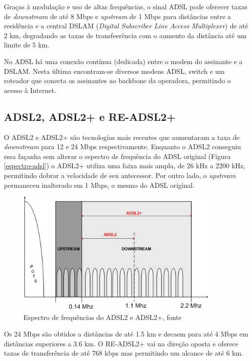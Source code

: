 \documentclass[brazil,times,12pt]{abnt}
\begin{document}
Graças à modulação e uso de altas frequências, o sinal ADSL pode oferecer taxas
de \emph{downstream} de até 8 Mbps e \emph{upstream} de 1 Mbps para distâncias
entre a residência e a central DSLAM (\emph{Digital Subscriber Line Access
Multiplexer}) de até 2 km, degradando as taxas de transfeerência com o aumento
da distância até um limite de 5 km.

No ADSL há uma conexão contínua (dedicada) entre o modem do assinante e a DSLAM.
Nesta última encontram-se diversos modens ADSL, switch e um roteador que conecta
os assinantes ao backbone da operadora, permitindo o acesso à Internet. 

\subsection*{ADSL2, ADSL2+ e RE-ADSL2+}
O ADSL2 e ADSL2+ são tecnologias mais recentes que aumentaram a taxa de
\emph{downstream} para 12 e 24 Mbps respectivamente. Enquanto o ADSL2 conseguiu
essa façanha sem alterar o espectro de frequência do ADSL original (Figura
\ref{espectro-adsl}) o ADSL2+ utiliza uma faixa mais ampla, de 26 kHz a 2200
kHz, permitindo dobrar a velocidade de seu antecessor. Por outro lado, o
\emph{upstream} permaneceu inalterado em 1 Mbps, o mesmo do ADSL original.

\begin{figure}[htp]
\begin{center}
  \includegraphics[width=100mm]{imagens/adsl2.png}
  \caption[Espectro de frequências do ADSL2 e ADSL2+, fonte
  \cite{morimoto:opcoes-acesso}]{Espectro de frequências do ADSL2 e ADSL2+,
  fonte \cite{morimoto:opcoes-acesso}}
  \label{espectro-adsl2}
\end{center}
\end{figure}

Os 24 Mbps são obtidos a distâncias de até 1.5 km e decaem para até 4
Mbps em distâncias superiores a 3.6 km. O RE-ADSL2+ vai na direção oposta e
oferece taxas de transferência de até 768 kbps mas permitindo um alcance de até
6 km. \cite{morimoto:opcoes-acesso}
\end{document}
